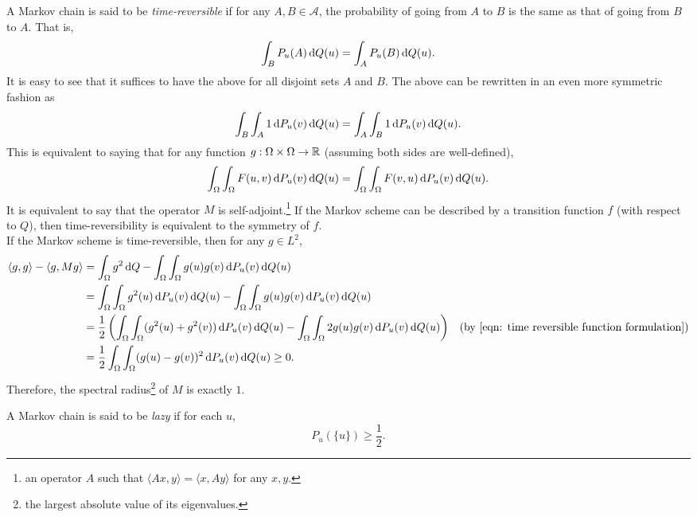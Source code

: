 A Markov chain is said to be \textit{time-reversible} if for any $A,B\in\mathcal{A}$, the probability of going from $A$ to $B$ is the same as that of going from $B$ to $A$. That is,
\[ \int_B P_u(A)\operatorname{d}\!{Q}(u) = \int_A P_u(B) \operatorname{d}\!{Q}(u). \]
It is easy to see that it suffices to have the above for all disjoint sets $A$ and $B$. The above can be rewritten in an even more symmetric fashion as
\[ \int_B \int_A 1\operatorname{d}\!{P}_u(v)\operatorname{d}\!{Q}(u) = \int_A \int_B 1\operatorname{d}\!{P}_u(v)\operatorname{d}\!{Q}(u). \]
This is equivalent to saying that for any function $g:\Omega\times\Omega\to\mathbb{R}$ (assuming both sides are well-defined),
\begin{equation}
\label{eqn: time reversible function formulation}
	\int_\Omega \int_\Omega F(u,v)\operatorname{d}\!{P}_u(v)\operatorname{d}\!{Q}(u) = \int_\Omega \int_\Omega F(v,u)\operatorname{d}\!{P}_u(v)\operatorname{d}\!{Q}(u).
\end{equation}
It is equivalent to say that the operator $M$ is self-adjoint.\footnote{an operator $A$ such that $\langle Ax,y\rangle=\langle x,A y\rangle$ for any $x,y$.} If the Markov scheme can be described by a transition function $f$ (with respect to $Q$), then time-reversibility is equivalent to the symmetry of $f$.\\
If the Markov scheme is time-reversible, then for any $g\in L^2$,
\begin{align}
	\langle g,g\rangle - \langle g,M g\rangle &= \int_{\Omega} g^2\d{Q} - \int_\Omega\int_\Omega g(u)g(v)\d{P_u}(v)\d{Q}(u) \nonumber \\
	&= \int_{\Omega}\int_\Omega g^2(u)\d{P_u}(v)\d{Q}(u) - \int_\Omega\int_\Omega g(u)g(v)\d{P_u}(v)\d{Q}(u) \nonumber \\
	&= \frac{1}{2} \left(\int_{\Omega}\int_\Omega (g^2(u)+g^2(v))\d{P_u}(v)\d{Q}(u) - \int_\Omega\int_\Omega 2g(u)g(v)\d{P_u}(v)\d{Q}(u)\right) & (\text{by \Cref{eqn: time reversible function formulation}}) \nonumber \\
	&= \frac{1}{2}\int_\Omega\int_\Omega (g(u)-g(v))^2\d{P_u}(v)\d{Q}(u) \geq 0. \label{eqn: self-adjoint spectral radius 1}
\end{align}
Therefore, the spectral radius\footnote{the largest absolute value of its eigenvalues.} of $M$ is exactly $1$.

\begin{definition}[Laziness]
A Markov chain is said to be \textit{lazy} if for each $u$,
\[ P_u(\{u\})\geq\frac{1}{2}. \]
\end{definition}

